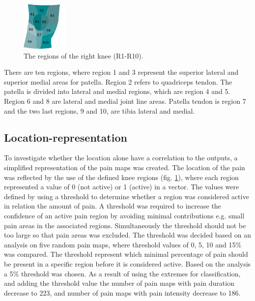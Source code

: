 \begin{figure} [H] 
\centering
\includegraphics[width=0.2\textwidth]{Figures/atlas}
\caption{The regions of the right knee (R1-R10).}
\label{fig:atlas}
\end{figure}

\noindent 
There are ten regions, where region 1 and 3 represent the superior lateral and superior medial areas for patella. Region 2 refers to quadriceps tendon. The patella is divided into lateral and medial regions, which are region 4 and 5. Region 6 and 8 are lateral and medial joint line areas. Patella tendon is region 7 and the two last regions, 9 and 10, are tibia lateral and medial.\citep{Elson2010}

\subsection*{\textbf{Location-representation}} 
\noindent
To investigate whether the location alone have a correlation to the outputs, a simplified representation of the pain maps was created. The location of the pain was reflected by the use of the defined knee regions (fig. \ref{fig:atlas}), where each region represented a value of 0 (not active) or 1 (active) in a vector.  The values were defined by using a threshold to determine whether a region was considered active in relation the amount of pain. A threshold was required to increase the confidence of an active pain region by avoiding minimal contributions e.g. small pain areas in the associated regions. Simultaneously the threshold should not be too large so that pain areas was excluded. The threshold was decided based on an analysis on five random pain maps, where threshold values of 0, 5, 10 and 15\% was compared. The threshold represent which minimal percentage of pain should be present in a specific region before it is considered active. Based on the analysis a 5\% threshold was chosen. As a result of using the extremes for classification, and adding the threshold value the number of pain maps with pain duration decrease to 223, and number of pain maps with pain intensity decrease to 186.  


